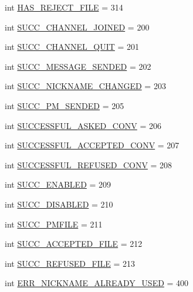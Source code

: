 \begin{DoxyCompactItemize}
int \hyperlink{namespace_server_ac45d5a8294d066cceee3b4f808f4ab04}{H\+A\+S\+\_\+\+R\+E\+J\+E\+C\+T\+\_\+\+F\+I\+L\+E} = 314
\item 
int \hyperlink{namespace_server_a0a446eb75138a1b946c7adf06feaa638}{S\+U\+C\+C\+\_\+\+C\+H\+A\+N\+N\+E\+L\+\_\+\+J\+O\+I\+N\+E\+D} = 200
\item 
int \hyperlink{namespace_server_a9653741644804867d5c762d637aa714a}{S\+U\+C\+C\+\_\+\+C\+H\+A\+N\+N\+E\+L\+\_\+\+Q\+U\+I\+T} = 201
\item 
int \hyperlink{namespace_server_ae41a5af03180af57ac7842e0309d4fa7}{S\+U\+C\+C\+\_\+\+M\+E\+S\+S\+A\+G\+E\+\_\+\+S\+E\+N\+D\+E\+D} = 202
\item 
int \hyperlink{namespace_server_a48248ec155d0641a5e47603f2b63b37f}{S\+U\+C\+C\+\_\+\+N\+I\+C\+K\+N\+A\+M\+E\+\_\+\+C\+H\+A\+N\+G\+E\+D} = 203
\item 
int \hyperlink{namespace_server_a01ffc4404f384ae4ca5ef739be4abacd}{S\+U\+C\+C\+\_\+\+P\+M\+\_\+\+S\+E\+N\+D\+E\+D} = 205
\item 
int \hyperlink{namespace_server_a44b9c60be4a9b7cb3840d7cf13a2ef07}{S\+U\+C\+C\+E\+S\+S\+F\+U\+L\+\_\+\+A\+S\+K\+E\+D\+\_\+\+C\+O\+N\+V} = 206
\item 
int \hyperlink{namespace_server_a9f976ad2360614ad56f0f9b69e1d5531}{S\+U\+C\+C\+E\+S\+S\+F\+U\+L\+\_\+\+A\+C\+C\+E\+P\+T\+E\+D\+\_\+\+C\+O\+N\+V} = 207
\item 
int \hyperlink{namespace_server_a70f0f7aa86090898f53d0f52d3f4e4d7}{S\+U\+C\+C\+E\+S\+S\+F\+U\+L\+\_\+\+R\+E\+F\+U\+S\+E\+D\+\_\+\+C\+O\+N\+V} = 208
\item 
int \hyperlink{namespace_server_a0d04d348838bfae170d279430a2570df}{S\+U\+C\+C\+\_\+\+E\+N\+A\+B\+L\+E\+D} = 209
\item 
int \hyperlink{namespace_server_a662b6a6d59fdbe98f37a4dac857f56e6}{S\+U\+C\+C\+\_\+\+D\+I\+S\+A\+B\+L\+E\+D} = 210
\item 
int \hyperlink{namespace_server_a0f9d2f56d8da4e1f082db5b399c53e49}{S\+U\+C\+C\+\_\+\+P\+M\+F\+I\+L\+E} = 211
\item 
int \hyperlink{namespace_server_a53415d85b058622e3aae5ce84985d5ce}{S\+U\+C\+C\+\_\+\+A\+C\+C\+E\+P\+T\+E\+D\+\_\+\+F\+I\+L\+E} = 212
\item 
int \hyperlink{namespace_server_aaaad6f296a49912bba515f1035d9af89}{S\+U\+C\+C\+\_\+\+R\+E\+F\+U\+S\+E\+D\+\_\+\+F\+I\+L\+E} = 213
\item 
int \hyperlink{namespace_server_a694f8f0d80fb62bdbe88484506f798e9}{E\+R\+R\+\_\+\+N\+I\+C\+K\+N\+A\+M\+E\+\_\+\+A\+L\+R\+E\+A\+D\+Y\+\_\+\+U\+S\+E\+D} = 400

\end{DoxyCompactItemize}
